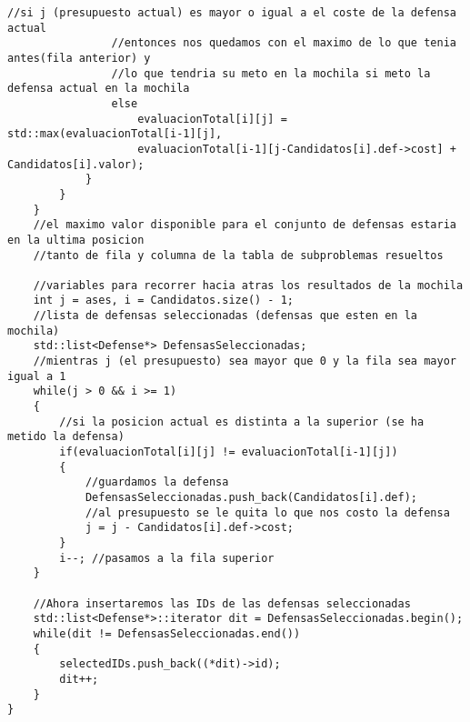 \begin{lstlisting}[frame=single,basicstyle=\tiny,title={Algoritmo para rellenar la tabla de subproblemas resueltos}]
                //si j (presupuesto actual) es mayor o igual a el coste de la defensa actual
                //entonces nos quedamos con el maximo de lo que tenia antes(fila anterior) y 
                //lo que tendria su meto en la mochila si meto la defensa actual en la mochila
                else
                    evaluacionTotal[i][j] = std::max(evaluacionTotal[i-1][j],
                    evaluacionTotal[i-1][j-Candidatos[i].def->cost] + Candidatos[i].valor);
            }
        }
    }
    //el maximo valor disponible para el conjunto de defensas estaria en la ultima posicion
    //tanto de fila y columna de la tabla de subproblemas resueltos 

	//variables para recorrer hacia atras los resultados de la mochila
    int j = ases, i = Candidatos.size() - 1;
    //lista de defensas seleccionadas (defensas que esten en la mochila)
    std::list<Defense*> DefensasSeleccionadas;
    //mientras j (el presupuesto) sea mayor que 0 y la fila sea mayor igual a 1
    while(j > 0 && i >= 1)
    {
    	//si la posicion actual es distinta a la superior (se ha metido la defensa)
        if(evaluacionTotal[i][j] != evaluacionTotal[i-1][j]) 
        {
        	//guardamos la defensa
            DefensasSeleccionadas.push_back(Candidatos[i].def);
            //al presupuesto se le quita lo que nos costo la defensa
            j = j - Candidatos[i].def->cost; 
        }   
        i--; //pasamos a la fila superior
    }

	//Ahora insertaremos las IDs de las defensas seleccionadas
    std::list<Defense*>::iterator dit = DefensasSeleccionadas.begin();
    while(dit != DefensasSeleccionadas.end())
    {
        selectedIDs.push_back((*dit)->id);
        dit++;
    }
}
\end{lstlisting}
